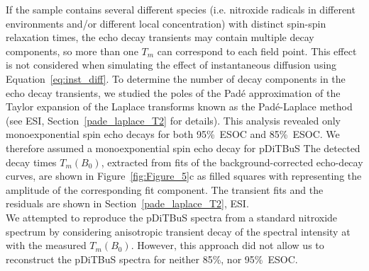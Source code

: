 If the sample contains several different species (i.e. nitroxide radicals in different environments and/or different local concentration) with distinct spin-spin relaxation times, the echo decay transients may contain multiple decay components, so more than one $T_m$ can correspond to each field point. This effect is not considered when simulating the effect of instantaneous diffusion using Equation~\ref{eq:inst_diff}. To determine the number of decay components in the echo decay transients, we studied the poles of the Pad{\'e} approximation of the Taylor expansion of the Laplace transforms  known as the Pad{\'e}-Laplace method~\cite{Hellen2005} (see ESI, Section~\ref{pade_laplace_T2} for details). This analysis revealed only monoexponential spin echo decays for both 95\%~ESOC and 85\%~ESOC. We therefore assumed a monoexponential spin echo decay for pDiTBuS The detected decay times $T_m(B_0)$, extracted from fits of the background-corrected echo-decay curves, are shown in Figure~\ref{fig:Figure_5}c as filled squares with  representing the amplitude of the corresponding fit component.  The transient fits and the residuals are shown in Section~\ref{pade_laplace_T2}, ESI.\\

We attempted to reproduce the pDiTBuS spectra from a standard nitroxide spectrum by considering anisotropic transient decay of the spectral intensity at  with the measured $T_m(B_0)$. However, this approach did not allow us to reconstruct the pDiTBuS spectra for neither 85\%, nor 95\%~ESOC.\\



